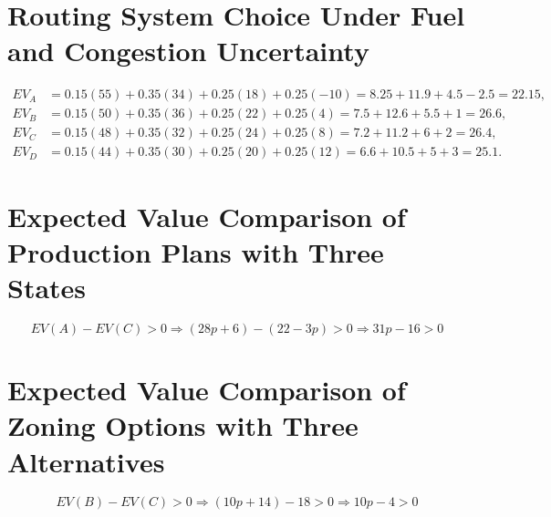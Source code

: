 \section{Routing System Choice Under Fuel and Congestion Uncertainty}
\[\begin{aligned}
		EV_A &= 0.15(55)+0.35(34)+0.25(18)+0.25(-10)=8.25+11.9+4.5-2.5=22.15,\\
		EV_B &= 0.15(50)+0.35(36)+0.25(22)+0.25(4)=7.5+12.6+5.5+1=26.6,\\
		EV_C &= 0.15(48)+0.35(32)+0.25(24)+0.25(8)=7.2+11.2+6+2=26.4,\\
		EV_D &= 0.15(44)+0.35(30)+0.25(20)+0.25(12)=6.6+10.5+5+3=25.1.
		\end{aligned}\]

\section{Expected Value Comparison of Production Plans with Three States}
\[EV(A)-EV(C)>0 \Rightarrow (28p+6)-(22-3p)>0 \Rightarrow 31p-16>0\]

\section{Expected Value Comparison of Zoning Options with Three Alternatives}
\[EV(B)-EV(C)>0 \Rightarrow (10p+14)-18>0 \Rightarrow 10p-4>0\]


